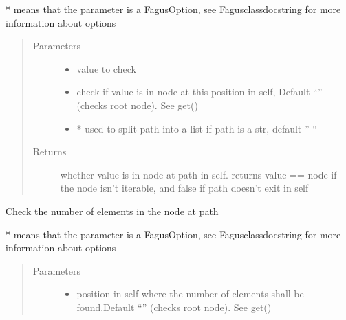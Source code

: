 \documentclass[a4paper,10pt,english]{sphinxmanual}
\begin{document}
\begin{fulllineitems}
\begin{fulllineitems}
\sphinxAtStartPar
* means that the parameter is a FagusOption, see Fagus\sphinxhyphen{}class\sphinxhyphen{}docstring for more information about options
\begin{quote}\begin{description}
\item[{Parameters}] \leavevmode\begin{itemize}
\item {}
\sphinxAtStartPar
{} \textendash{} value to check

\item {}
\sphinxAtStartPar
{} \textendash{} check if value is in node at this position in self, Default “” (checks root node). See get()

\item {}
\sphinxAtStartPar
{} \textendash{} * used to split path into a list if path is a str, default ” “

\end{itemize}

\item[{Returns}] \leavevmode
\sphinxAtStartPar
whether value is in node at path in self. returns value == node if the node isn’t iterable, and false if
path doesn’t exit in self

\end{description}\end{quote}

\end{fulllineitems}


\begin{fulllineitems}
\label{\detokenize{fagus:fagus.Fagus.count}}
\pysigstartsignatures
{}
\pysigstopsignatures
\sphinxAtStartPar
Check the number of elements in the node at path

\sphinxAtStartPar
* means that the parameter is a FagusOption, see Fagus\sphinxhyphen{}class\sphinxhyphen{}docstring for more information about options
\begin{quote}\begin{description}
\item[{Parameters}] \leavevmode\begin{itemize}
\item {}
\sphinxAtStartPar
{} \textendash{} position in self where the number of elements shall be found.Default “” (checks root node). See get()


\end{itemize}
\end{description}
\end{quote}
\end{fulllineitems}
\end{fulllineitems}
\end{document}
